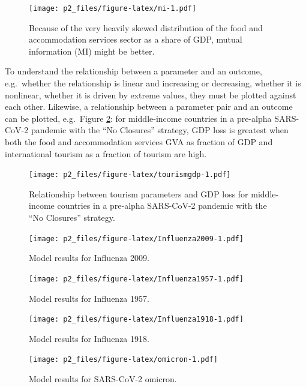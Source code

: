 \documentclass[
]{article}
\begin{document}
\begin{figure}
\centering
\texttt{[image: p2\_files/figure-latex/mi-1.pdf]}
\caption{\label{fig:mi}Because of the very heavily skewed distribution of the food and accommodation services sector as a share of GDP, mutual information (MI) might be better.}
\end{figure}

\newpage

To understand the relationship between a parameter and an outcome, e.g.~whether the relationship is linear and increasing or decreasing, whether it is nonlinear, whether it is driven by extreme values, they must be plotted against each other. Likewise, a relationship between a parameter pair and an outcome can be plotted, e.g.~Figure \ref{fig:tourismgdp}: for middle-income countries in a pre-alpha SARS-CoV-2 pandemic with the ``No Closures'' strategy, GDP loss is greatest when both the food and accommodation services GVA as fraction of GDP and international tourism as a fraction of tourism are high.

\begin{figure}
\centering
\texttt{[image: p2\_files/figure-latex/tourismgdp-1.pdf]}
\caption{\label{fig:tourismgdp}Relationship between tourism parameters and GDP loss for middle-income countries in a pre-alpha SARS-CoV-2 pandemic with the ``No Closures'' strategy.}
\end{figure}

\begin{figure}
\centering
\texttt{[image: p2\_files/figure-latex/Influenza2009-1.pdf]}
\caption{\label{fig:Influenza2009}Model results for Influenza 2009.}
\end{figure}

\begin{figure}
\centering
\texttt{[image: p2\_files/figure-latex/Influenza1957-1.pdf]}
\caption{\label{fig:Influenza1957}Model results for Influenza 1957.}
\end{figure}

\begin{figure}
\centering
\texttt{[image: p2\_files/figure-latex/Influenza1918-1.pdf]}
\caption{\label{fig:Influenza1918}Model results for Influenza 1918.}
\end{figure}

\begin{figure}
\centering
\texttt{[image: p2\_files/figure-latex/omicron-1.pdf]}
\caption{\label{fig:omicron}Model results for SARS-CoV-2 omicron.}
\end{figure}
\end{document}
